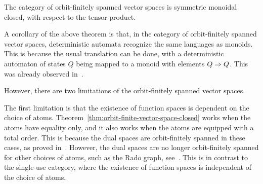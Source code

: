 \begin{theorem}\label{thm:orbit-finite-vector-space-closed} The category of orbit-finitely spanned vector spaces is symmetric monoidal closed, with respect to the tensor product.
\end{theorem}


A corollary of the above theorem is that, in the category of orbit-finitely spanned vector spaces, deterministic automata recognize the same languages as monoids. This is because the usual translation can be done, with a deterministic automaton of states $Q$ being mapped to a monoid with elements $Q \Rightarrow Q$. This was already observed in~\cite[Theorem VIII.3]{bojanczykKM21OrbitFiniteVector}.

However, there are two limitations of the orbit-finitely spanned vector spaces. 

The first limitation is that the existence of function spaces is dependent on the choice of atoms. Theorem~\ref{thm:orbit-finite-vector-space-closed}  works when the atoms have equality only, and it also works when the atoms are equipped with a total order. This is because the dual spaces are orbit-finitely spanned in these cases, as proved in~\cite[Corollary VI.5]{bojanczykKM21OrbitFiniteVector}. However, the dual spaces are no longer orbit-finitely spanned for other choices of  atoms, such as the Rado graph, see~\cite[Example 9]{bojanczykKM21OrbitFiniteVector}. This is in contrast to the single-use category, where the existence of function spaces is independent of the choice of atoms. 

